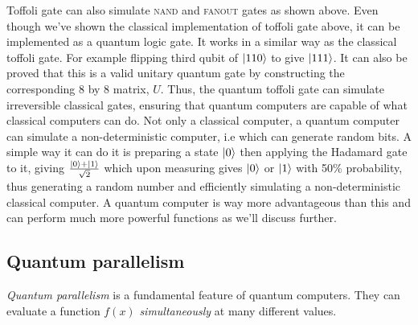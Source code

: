 Toffoli gate can also simulate \textsc{nand} and \textsc{fanout} gates as shown above. Even though we've shown the classical implementation of toffoli gate above, it can be implemented as a quantum logic gate. It works in a similar way as the classical toffoli gate. For example flipping third qubit of $\ket{110}$ to give $\ket{111}$. It can also be proved that this is a valid unitary quantum gate by constructing the corresponding 8 by 8 matrix, $U$. Thus, the quantum toffoli gate can simulate irreversible classical gates, ensuring that quantum computers are capable of what classical computers can do. Not only a classical computer, a quantum computer can simulate a non-deterministic computer, i.e which can generate random bits. A simple way it can do it is preparing a state $\ket{0}$ then applying the Hadamard gate to it, giving $\frac{\ket{0}+\ket{1}}{\sqrt{2}}$ which upon measuring gives $\ket{0}$ or $\ket{1}$ with 50\% probability, thus generating a random number and efficiently simulating a non-deterministic classical computer. A quantum computer is way more advantageous than this and can perform much more powerful functions as we'll discuss further.

\subsection{Quantum parallelism}
\textit{Quantum parallelism} is a fundamental feature of quantum computers. They can evaluate a function $f(x)$ \textit{simultaneously} at many different values. 

